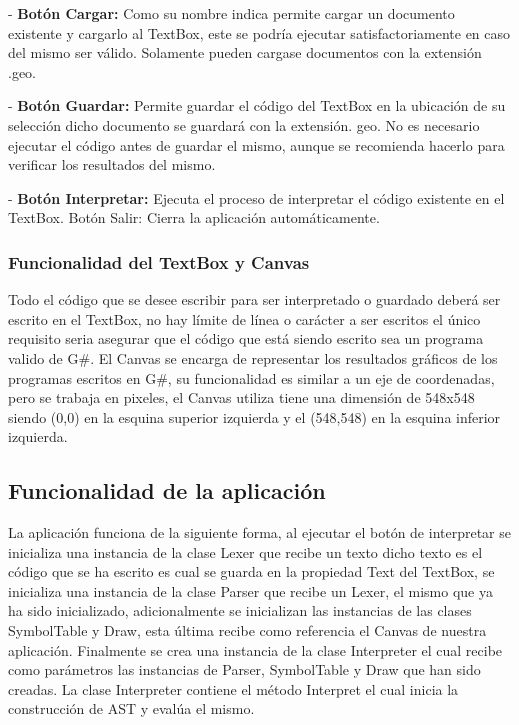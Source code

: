 \documentclass[a4paper,12pt]{article}
\begin{document}
	- \textbf{Botón Cargar:} Como su nombre indica permite cargar un documento existente y cargarlo al TextBox, este se podría ejecutar satisfactoriamente en caso del mismo ser válido. Solamente pueden cargase documentos con la extensión .geo.
	
	- \textbf{Botón Guardar:} Permite guardar el código del TextBox en la ubicación de su selección dicho documento se guardará con la extensión. geo. No es necesario ejecutar el código antes de guardar el mismo, aunque se recomienda hacerlo para verificar los resultados del mismo.
	
	- \textbf{Botón Interpretar:} Ejecuta el proceso de interpretar el código existente en el TextBox.
	Botón Salir: Cierra la aplicación automáticamente.
	
	\subsubsection{Funcionalidad del TextBox y Canvas}\label{subsub:funcionalidad del TextBox y Canvas:}
	Todo el código que se desee escribir para ser interpretado o guardado deberá ser escrito en el TextBox, no hay límite de línea o carácter a ser escritos el único requisito seria asegurar que el código que está siendo escrito sea un programa valido de G\#. El Canvas se encarga de representar los resultados gráficos de los programas escritos en G\#, su funcionalidad es similar a un eje de coordenadas, pero se trabaja en pixeles, el Canvas utiliza tiene una dimensión de 548x548 siendo (0,0) en la esquina superior izquierda y el (548,548) en la esquina inferior izquierda.
	
	\subsection{Funcionalidad de la aplicación}
	La aplicación funciona de la siguiente forma, al ejecutar el botón de interpretar se inicializa una instancia de la clase Lexer que recibe un texto dicho texto es el código que se ha escrito es cual se guarda en la propiedad Text del TextBox, se inicializa una instancia de la clase Parser que recibe un Lexer, el mismo que ya ha sido inicializado, adicionalmente se inicializan las instancias de las clases SymbolTable y Draw, esta última recibe como referencia el Canvas de nuestra aplicación. Finalmente se crea una instancia de la clase Interpreter el cual recibe como parámetros las instancias de Parser, SymbolTable y Draw que han sido creadas. La clase Interpreter contiene el método Interpret el cual inicia la construcción de AST y evalúa el mismo.
	
\end{document}
